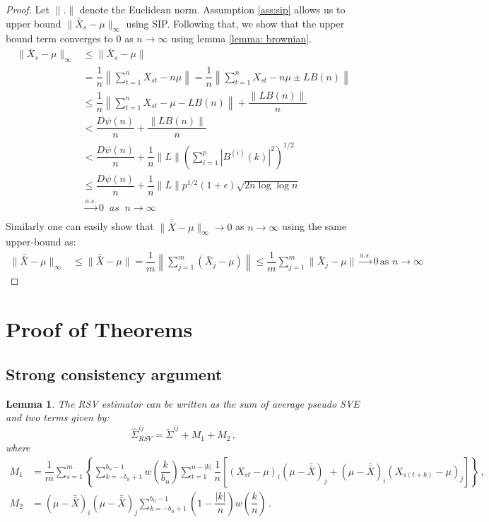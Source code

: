 \documentclass[12pt]{article}
\newtheorem{lemma}{Lemma}
\theoremstyle{remark}
\begin{document}
\begin{proof}
Let $\|.\|$ denote the Euclidean norm. Assumption \ref{ass:sip} allows us to upper bound $\|\bar{X}_s - \mu\|_{\infty}$ using SIP. Following that, we show that the upper bound term converges to 0 as $n \to \infty$ using lemma \ref{lemma: brownian}.
 \begin{align*}
    \|\bar{X}_s - \mu\|_{\infty} & \leq \|\bar{X}_s - \mu\| \\
    &= \dfrac{1}{n}\left\|\sum_{t=1}^{n}X_{st} - n\mu\right\| = \dfrac{1}{n}  \left \|\sum_{t=1}^{n}X_{st} - n\mu \pm L B(n) \right\|\\
    & \leq \dfrac{1}{n}\left\|\sum_{t=1}^{n}X_{st} - \mu - L B(n)\right\| + \dfrac{\left\|L B(n)\right\|}{n}\\
    &< \dfrac{D\psi(n)}{n} + \dfrac{\|L B(n)\|}{n}\\
    &< \dfrac{D\psi(n)}{n} + \dfrac{1}{n}\|L\| \left(\sum\limits_{i=1}^{p}|B^{(i)}(k)|^2\right)^{1/2}\\
    & \leq \dfrac{D\psi(n)}{n} + \dfrac{1}{n}\|L\| p^{1/2}(1+\epsilon)\sqrt{2n \log\log n}\\
    & \xrightarrow[]{a.s.} 0\;\; as \;\; n\to \infty
 \end{align*}
%
Similarly one can easily show that $\|\bar{\bar{X}} - \mu\|_{\infty} \to 0$ as $n \to \infty$ using the same upper-bound as:
% 
\begin{align*}
    \|\bar{\bar{X}} - \mu\|_{\infty} & \leq \|\bar{\bar{X}} - \mu\| = \dfrac{1}{m}\left \|\sum_{j=1}^{m}(\bar{X}_j- \mu) \right\| \leq \dfrac{1}{m}\sum_{j=1}^{m}\|\bar{X}_j - \mu\| \xrightarrow{a.s.} 0 \, \textrm{as } n \to \infty 
\end{align*}
\end{proof}


\section{Proof of Theorems} \label{appendix:A}

\subsection{Strong consistency argument} \label{appendix:strong_consis}

\begin{lemma} \label{lemma:rsv_breakdown}
    The RSV estimator can be written as the sum of average pseudo SVE and two terms given by:
    \[
    \hat{\Sigma}_{RSV}^{ij} = \tilde{\Sigma}^{ij} + M_1 + M_2\,,
    \]
    where 
\begin{align*}
  M_1 & = \dfrac{1}{m}\sum\limits_{s=1}^{m}\left\{\sum\limits_{k=-b_n+1}^{b_n-1}w\left(\dfrac{k}{b_n}\right)\sum\limits_{t=1}^{n-|k|}\dfrac{1}{n}\left[ \left(X_{st}-\mu \right)_i   \left(\mu-\bar{\bar{X}} \right)_j +    \left(\mu-\bar{\bar{X}} \right)_i  \left(X_{s(t+k)}-\mu \right)_j \right]\right\}\,, \\ 
M_2 &= \left(\mu-\bar{\bar{X}} \right)_i   \left(\mu-\bar{\bar{X}} \right)_j\sum\limits_{k=-b_n+1}^{b_n-1}\left(1-\dfrac{|k|}{n}\right)w\left(\dfrac{k}{n}\right)\,.
\end{align*}
\end{lemma}
\end{document}
